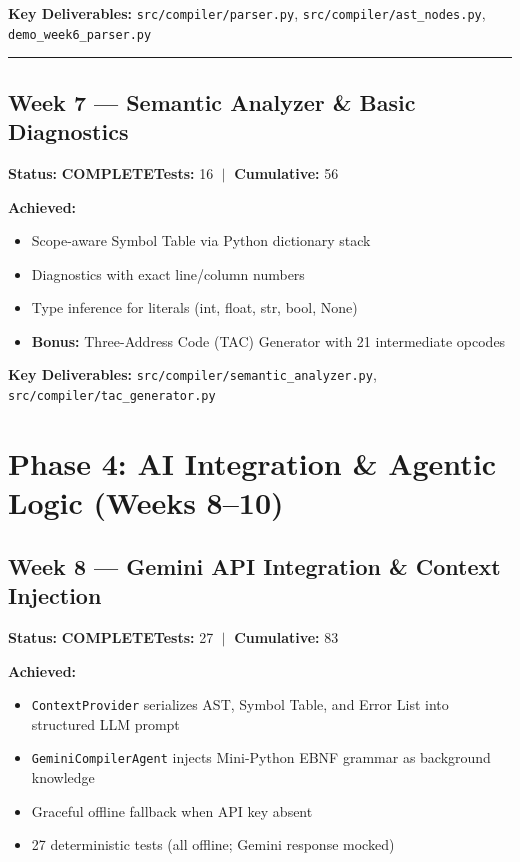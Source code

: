 \documentclass[a4paper,11pt]{article}
\newcommand{\done}{\colorbox{green!25}{\textbf{\small COMPLETE}}}
\begin{document}
\textbf{Key Deliverables:} \texttt{src/compiler/parser.py}, \texttt{src/compiler/ast\_nodes.py}, \texttt{demo\_week6\_parser.py}

\vspace{4pt}\hrule\vspace{6pt}

\subsection{Week 7 --- Semantic Analyzer \& Basic Diagnostics}

\textbf{Status:} \done \hfill \textbf{Tests:} 16 $\;|\;$ \textbf{Cumulative:} 56

\textbf{Achieved:}
\begin{itemize}[leftmargin=*, itemsep=1pt]
    \item Scope-aware Symbol Table via Python dictionary stack
    \item Diagnostics with exact line/column numbers
    \item Type inference for literals (int, float, str, bool, None)
    \item \textbf{Bonus:} Three-Address Code (TAC) Generator with 21 intermediate opcodes
\end{itemize}

\textbf{Key Deliverables:} \texttt{src/compiler/semantic\_analyzer.py}, \texttt{src/compiler/tac\_generator.py}

\section{Phase 4: AI Integration \& Agentic Logic (Weeks 8--10)}

\subsection{Week 8 --- Gemini API Integration \& Context Injection}

\textbf{Status:} \done \hfill \textbf{Tests:} 27 $\;|\;$ \textbf{Cumulative:} 83

\textbf{Achieved:}
\begin{itemize}[leftmargin=*, itemsep=1pt]
    \item \texttt{ContextProvider} serializes AST, Symbol Table, and Error List into structured LLM prompt
    \item \texttt{GeminiCompilerAgent} injects Mini-Python EBNF grammar as background knowledge
    \item Graceful offline fallback when API key absent
    \item 27 deterministic tests (all offline; Gemini response mocked)
\end{itemize}
\end{document}
